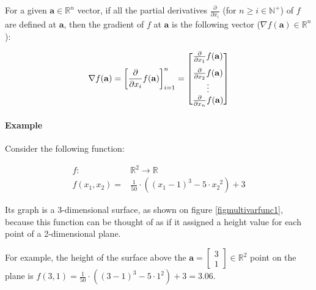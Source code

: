 \documentclass{article}
\begin{document}
            For a given $\mathbf{a} \in \mathbb{R}^n$ vector, if all the
            partial derivatives $\frac{\partial}{\partial x_i}$ (for
            $n \geq i \in \mathbb{N}^+$) of $f$ are defined at $\mathbf{a}$,
            then the gradient of $f$ at $\mathbf{a}$ is the following vector
            ($\nabla f(\mathbf{a}) \in \mathbb{R}^n$):

            \begin{align*}
              \nabla f(\mathbf{a})
                = \left[
                    \frac{\partial}{\partial x_i} f(\mathbf{a})
                  \right]_{i=1}^n
                = \begin{bmatrix}
                    \vspace{1.5ex}
                    \frac{\partial}{\partial x_1} f(\mathbf{a}) \\
                    \frac{\partial}{\partial x_2} f(\mathbf{a}) \\
                    \vdots \\
                    \frac{\partial}{\partial x_n} f(\mathbf{a})
                  \end{bmatrix}
            \end{align*}

          \paragraph{Example}\label{parmultivarexample}

            Consider the following function:

            \begin{align*}
              f : & \mathbb{R}^2 \rightarrow \mathbb{R} \\
              f(x_1, x_2)
                = & \frac{1}{50}
                    \cdot
                    \left( (x_1 - 1)^3 - 5 \cdot x_2^{\enspace 2} \right) + 3
            \end{align*}

            Its graph is a 3-dimensional surface, as shown on figure
            \ref{figmultivarfunc1}, because this function can be thought of as
            if it assigned a height value for each point of a 2-dimensional
            plane.

            For example, the height of the surface above the
            $\mathbf{a} = \begin{bmatrix}3 \\ 1\end{bmatrix} \in \mathbb{R}^2$
            point on the plane is
            $
              f(3, 1)
                = \frac{1}{50} \cdot \left( (3-1)^3 - 5 \cdot 1^2 \right) + 3
                = 3.06
            $.
\end{document}
